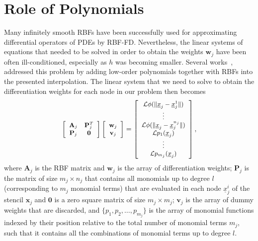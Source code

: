 \documentclass{UUThesisTemplate}
\begin{document}
\section{Role of Polynomials}
Many infinitely smooth RBFs have been successfully used for approximating differential operators of PDEs by RBF-FD. Nevertheless, the linear systems of equations that needed to be solved in order to obtain the weights $\mathbf{w}_j$ have been often ill-conditioned, especially as $h$ was becoming smaller. Several works~\cite{davydov2011adaptive, fornberg2011stabilization, flyer2012guide, larsson2013stable, fornberg2013stable, flyer2016enhancing}, addressed this problem by adding low-order polynomials together with RBFs into the presented interpolation. The linear system that we need to solve to obtain the differentiation weights for each node in our problem then becomes
\begin{equation}
{\footnotesize{
\label{eq:D2}
\left[\begin{array}{cc}
\mathbf{A}_j & \mathbf{P}_j^T \\
\mathbf{P}_j & \mathbf{0} \\
\end{array}\right]
\left[\begin{array}{c}
{\mathbf{w}}_j\\
{\mathbf{v}}_j\\
\end{array}\right]=
\left[\begin{array}{c}
\mathcal{L}\phi(\|\underline{x}_{j}-\underline{x}_j^{1}\|)\\
\vdots \\
\mathcal{L}\phi(\|\underline{x}_{j}-\underline{x}_j^{n_j}\|)\\
\mathcal{L}p_1(\underline{x}_j)\\
\vdots\\
\mathcal{L}p_{m_j}(\underline{x}_j)
\end{array}\right],
}}
\end{equation}
where $\mathbf{A}_j$ is the RBF matrix and $\mathbf{w}_j$ is the array of differentiation weights; $\mathbf{P}_j$ is the matrix of size $m_j \times n_j$ that contains all monomials up to degree $l$ (corresponding to $m_j$ monomial terms) that are evaluated in each node $\underline{x}_j^i$ of the stencil $\mathbf{x}_j$ and $\mathbf{0}$ is a zero square matrix of size $m_j \times m_j$; $\mathbf{v}_j$ is the array of dummy weights that are discarded, and $\{p_1, p_2, \ldots, p_{m_j}\}$ is the array of monomial functions indexed by their position relative to the total number of monomial terms $m_j$, such that it contains all the combinations of monomial terms up to degree $l$.
\end{document}
